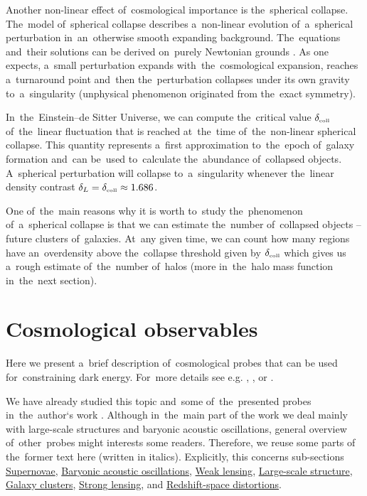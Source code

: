 Another non-linear effect of~cosmological importance is the~spherical collapse. The~model of~spherical collapse describes a~non-linear evolution of~a~spherical perturbation in~an~otherwise smooth expanding background. The~equations and~their solutions can be derived on~purely Newtonian grounds \parencite{2010deto.book.....A}. As one expects, a~small perturbation expands with~the~cosmological expansion, reaches a~turnaround point and~then the~perturbation collapses under its own gravity to~a~singularity (unphysical phenomenon originated from the~exact symmetry).

In~the~Einstein--de Sitter Universe, we can compute the~critical value $\delta_\text{\tiny coll}$ of~the~linear fluctuation that is reached at~the~time of~the~non-linear spherical collapse. This quantity represents a~first approximation to~the~epoch of~galaxy formation and~can be~used to~calculate the~abundance of~collapsed objects. A~spherical perturbation will collapse to~a~singularity whenever the~linear density contrast $\delta_L=\delta_\text{\tiny coll}\approx1.686$.

One of~the~main reasons why it is worth to~study the~phenomenon of~a~spherical collapse is that we can estimate the~number of~collapsed objects -- future clusters of~galaxies. At~any given time, we can count how many regions have an~overdensity above the~collapse threshold given by $\delta_\text{\tiny coll}$ which gives us a~rough estimate of~the~number of~halos (more in~the~halo mass function in~the~next section).
 
\section{Cosmological observables}
Here we present a~brief description of~cosmological probes that can be used for~constraining dark energy. For~more details see e.g. \textcite{weinberg_observational_2013}, \textcite{2010deto.book.....A}, or \textcite{DE_probes2}.

We have already studied this topic and~some of~the~presented probes in~the~author`s work \textcite{mastersthesis_vrastil}. Although in~the~main part of the work we deal mainly with large-scale structures and baryonic acoustic oscillations, general overview of~other~probes might interests some readers. Therefore, we reuse some parts of the~former text here (written in italics). Explicitly, this concerns sub-sections \hyperref[ssec:supernovae]{Supernovae}, \hyperref[sec:bao]{Baryonic acoustic oscillations}, \hyperref[ssec:wl]{Weak lensing}, \hyperref[ssec:lss]{Large-scale structure}, \hyperref[ssec:gc]{Galaxy clusters}, \hyperref[ssec:SL]{Strong lensing}, and \hyperref[sec:rsd]{Redshift-space distortions}.

